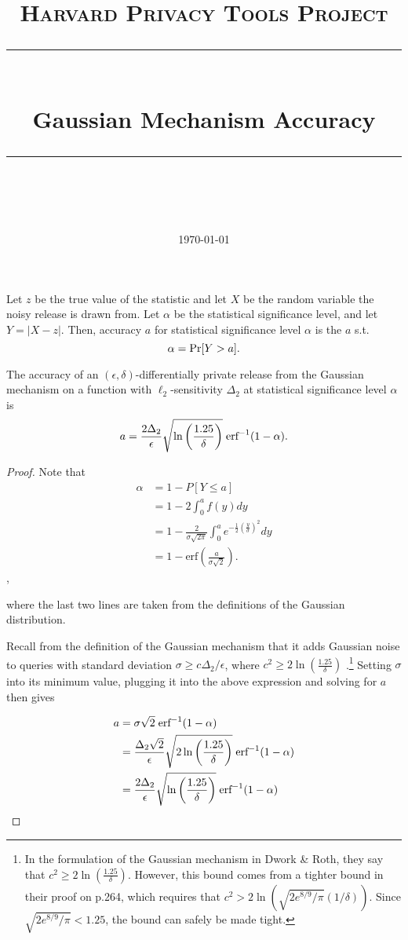 \documentclass[11pt]{scrartcl} %
\title{
	\normalfont\normalsize
	\textsc{Harvard Privacy Tools Project}\\ %
	\vspace{25pt} %
	\rule{\linewidth}{0.5pt}\\ %
	\vspace{20pt} %
	{\huge Gaussian Mechanism Accuracy}\\ %
	\vspace{12pt} %
	\rule{\linewidth}{2pt}\\ %
	\vspace{12pt} %
}
\date{\normalsize\today} %
\begin{document}
\maketitle

\begin{definition}
Let $z$ be the true value of the statistic and let $X$ be the random variable the noisy release is drawn from. Let $\alpha$ be the statistical significance level, and let $Y = \vert X-z \vert.$ Then, accuracy $a$ for statistical significance level $\alpha$ is the $a$ s.t.
$$ \alpha = \text{Pr}[Y > a].$$
\end{definition}

\begin{theorem}
The accuracy of an $(\epsilon,\delta)$-differentially private release from the Gaussian mechanism on a function with $\ell_2$-sensitivity $\Delta_2$ at statistical significance level $\alpha$ is
$$ a = \frac{2 \Delta_2}{\epsilon} \sqrt{\ln \left( \frac{1.25}{\delta} \right)} \hspace{0.1cm} \text{erf}^{-1} (1 - \alpha).$$
\end{theorem}

\begin{proof}
Note that
\begin{align*}
\alpha &= 1 - P[Y \le a] \\
	&= 1 - 2 \int_0^a f(y) dy \\
	&= 1 - \frac{2}{\sigma \sqrt{2\pi}} \int_0^a e^{-\frac{1}{2}\left( \frac{y}{\sigma}\right)^2} dy \\
	&= 1 - \text{erf}\left( \frac{a}{\sigma \sqrt{2}}\right).
\end{align*},

where the last two lines are taken from the definitions of the Gaussian distribution.

Recall from the definition of the Gaussian mechanism that it adds Gaussian noise to queries with standard deviation
$\sigma \ge c \Delta_2 / \epsilon$, where $c^2 \ge 2 \ln \left( \frac{1.25}{\delta} \right)$ \cite{DR14}.\footnote{In the formulation of the Gaussian mechanism in Dwork \& Roth, they say that $c^2 \ge 2 \ln \left( \frac{1.25}{\delta} \right)$. However, this bound comes from a tighter bound in their proof on p.264, which requires that $c^2 > 2 \ln (\sqrt{2 e^{8/9}/\pi}(1/\delta))$. Since $\sqrt{2 e^{8/9}/\pi} < 1.25$, the bound can safely be made tight.} Setting $\sigma$ into its minimum value, plugging it into the above expression and solving for $a$ then gives

\begin{align*}
a &= \sigma \sqrt{2} \hspace{0.1cm} \text{erf}^{-1} (1 - \alpha)\\
	&= \frac{\Delta_2 \sqrt{2}}{\epsilon} \sqrt{ 2 \ln \left( \frac{1.25}{\delta} \right)} \hspace{0.1cm} \text{erf}^{-1} (1 - \alpha)\\
	&= \frac{2 \Delta_2}{\epsilon} \sqrt{\ln \left( \frac{1.25}{\delta} \right)} \hspace{0.1cm} \text{erf}^{-1} (1 - \alpha)
\end{align*}
\end{proof}



\end{document}
